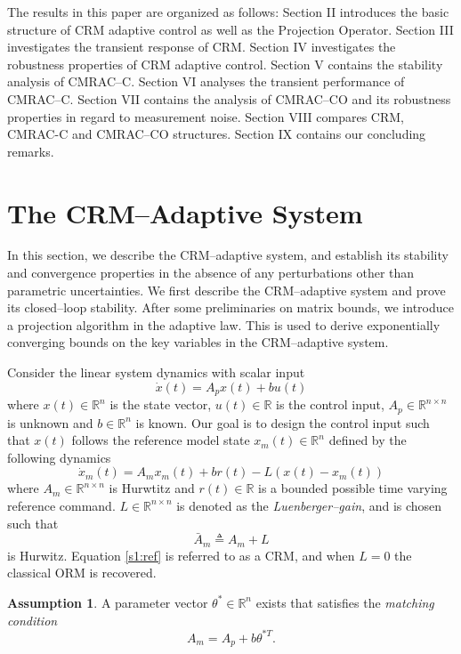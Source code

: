 \documentclass[10pt,journal]{IEEEtran}
\theoremstyle{plain}%
\theoremstyle{definition}
\newtheorem{assm}{Assumption}
\newcommand{\be}[0]{\begin{equation}}
\newcommand{\ee}[0]{\end{equation}}
\renewcommand{\Re}[0]{\mathbb R}
\begin{document}
  
  
The results in this paper are organized as follows: Section II introduces the basic structure of CRM adaptive control as well as the Projection Operator. Section III investigates the transient response of CRM. Section IV investigates the robustness properties of CRM adaptive control. Section V contains the stability analysis of CMRAC--C. Section VI analyses the transient performance of CMRAC--C. Section VII contains the analysis of CMRAC--CO and its robustness properties in regard to measurement noise. Section VIII compares CRM, CMRAC-C and CMRAC--CO structures. Section IX contains our concluding remarks.





\section{The CRM--Adaptive System}\label{sec:l} 


In this section, we describe the CRM--adaptive system, and establish its stability and convergence properties in the absence of any perturbations other than parametric uncertainties. We first describe the CRM--adaptive system and prove its closed--loop stability. After some preliminaries on matrix bounds, we introduce a projection algorithm in the adaptive law. This is used to derive exponentially converging bounds on the key variables in the CRM--adaptive system. 

Consider the linear system dynamics with scalar input
\be\label{s1:sys}
\dot x(t) = A_p x(t) + b u(t)
\ee
where ${x(t) \in \Re^n}$ is the state vector, ${u(t)\in \Re}$ is the control input, ${A_p\in \Re^{n \times n}}$ is unknown and ${b\in \Re^n}$ is known. Our goal is to design the control input such that ${x(t)}$ follows the reference model state ${x_m(t)\in \Re^n}$ defined by  the following dynamics
\be\label{s1:ref}
\dot x_m(t) = A_m x_m(t) + b r(t) - L(x(t)-x_m(t))
\ee
where ${A_m \in \Re^{n\times n }}$ is Hurwtitz and ${r(t)\in \Re}$ is a bounded possible time varying reference command. ${L\in \Re^{n\times n}}$ is denoted as the {\em Luenberger--gain}, and is chosen such that 
\be\label{s1:ambar}
\bar A_m \triangleq A_m+L
\ee
is Hurwitz. Equation \eqref{s1:ref} is referred to as a CRM, and when ${L=0}$ the classical ORM is recovered.


\begin{assm}\label{asm:m}
A parameter vector ${\theta^*\in\Re^n}$ exists that satisfies the {\em matching condition}
\be\label{s1:match}
A_m=A_p+b\theta^{*T}.
\ee
\end{assm} 
\end{document}
